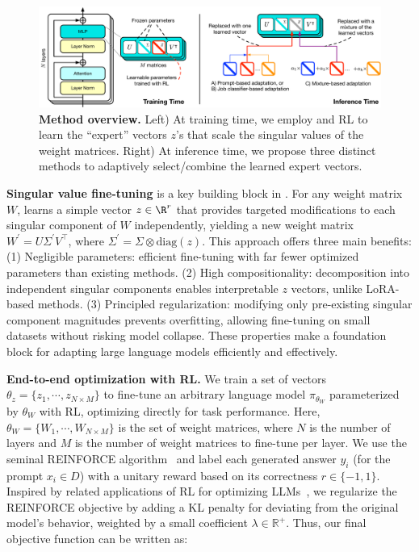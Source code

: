 \begin{figure}[!h]
    \centering
    \includegraphics[width=\textwidth]{images/method_overview.pdf}
    \caption{\textbf{Method overview.}
    Left) At training time, we employ \svdacro and RL to learn the ``expert'' vectors $z$'s that scale the singular values of the weight matrices.
    Right) At inference time, we propose three distinct methods to adaptively select/combine the learned expert vectors.
    }
    \label{fig:method_overview}
\end{figure}

\textbf{Singular value fine-tuning}\label{sec:svf} is a key building block in \implname. For any weight matrix $W$, \svdacro learns a simple vector $z\in \R^r$ that provides targeted modifications to each singular component of  $W$ independently, yielding a new weight matrix $W^\prime=U \Sigma^\prime V^\intercal$, where $\Sigma^\prime=\Sigma \otimes\text{diag}(z)$.
This approach offers three main benefits: (1) Negligible parameters: efficient fine-tuning with far fewer optimized parameters than existing methods. 
(2) High compositionality: decomposition into independent singular components enables interpretable $z$ vectors, unlike LoRA-based methods. 
(3) Principled regularization: modifying only pre-existing singular component magnitudes prevents overfitting, allowing fine-tuning on small datasets without risking model collapse. 
These properties make \svdacro a foundation block for adapting large language models efficiently and effectively.

\textbf{End-to-end optimization with RL.} We train a set of \svdacro vectors $\theta_z = \{z_1, \cdots, z_{N \times M}\}$ to fine-tune an arbitrary language model $\pi_{\theta_W}$ parameterized by $\theta_{W}$ with RL, optimizing directly for task performance.
Here, $\theta_{W}=\{ W_1, \cdots, W_{N \times M} \}$ is the set of weight matrices, where $N$ is the number of layers and $M$ is the number of weight matrices to fine-tune per layer.
We use the seminal REINFORCE algorithm~\citep{williams1992simple} and label each generated answer $y_i$ (for the prompt $x_i\in D$) with a unitary reward based on its correctness $r\in \{-1, 1\}$.
Inspired by related applications of RL for optimizing LLMs~\citep{ouyang2022training}, we regularize the REINFORCE objective by adding a KL penalty for deviating from the original model's behavior, weighted by a small coefficient $\lambda \in \mathbb{R^+}$. Thus, our final objective function can be written as:

